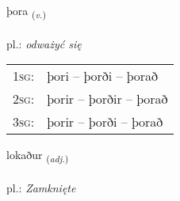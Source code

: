 \documentclass[frontgrid, backgrid]{flacards}\usepackage[]{graphicx}\usepackage[]{xcolor}
\begin{document}
\renewcommand{\flhead}{\vskip5pt \fboxsep=0pt {\small\bfseries\footnotesize Sagnorð | Verb}}
\renewcommand{\fcfoot}{\vskip5pt \fboxsep=0pt \hspace{2pt}{\small\bfseries\footnotesize 2K}}

\renewcommand{\blhead}{\vskip5pt {\small\bfseries\footnotesize Sagnorð | Verb }}
\renewcommand{\bcfoot}{\vskip5pt \hspace{2pt}{\small\bfseries\footnotesize 2K}}


{þora \small{\textsubscript{(\textit{v.})}} \\[1ex] %
\textphonetic{[θɔːra]} \\
pl.: \emph{odważyć się} \\  [2ex]
\renewcommand*{\arraystretch}{0.8}
\begin{tabular}{p{1cm}l}
\textsc{1sg}: & þori -- þorði -- þorað \\ 
\textsc{2sg}: & þorir -- þorðir -- þorað \\ 
\textsc{3sg}: & þorir -- þorði -- þorað \\ 
\end{tabular}
}

\renewcommand{\flhead}{\vskip5pt \fboxsep=0pt {\small\bfseries\footnotesize Lýsingarorð | Adjective}}
\renewcommand{\fcfoot}{\vskip5pt \fboxsep=0pt \hspace{2pt}{\small\bfseries\footnotesize 2K}}

\renewcommand{\blhead}{\vskip5pt {\small\bfseries\footnotesize Lýsingarorð | Adjective }}
\renewcommand{\bcfoot}{\vskip5pt \hspace{2pt}{\small\bfseries\footnotesize 2K}}


{lokaður \small{\textsubscript{(\textit{adj.})}} \\[1ex] %
\textphonetic{[lɔːkaðʏr]} \\
pl.: \emph{Zamknięte} \\  [2ex]
\renewcommand*{\arraystretch}{0.8}
}
\end{document}
